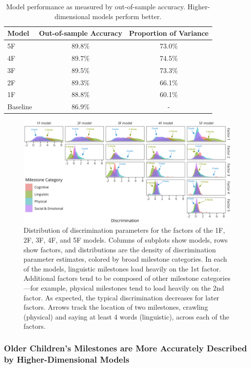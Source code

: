 \documentclass[man, floatsintext]{apa7}
\begin{document}
\begin{table}[!ht]
\caption{\label{tab:study1results}Model performance as measured by out-of-sample accuracy. Higher-dimensional models perform better.}
\centering
\begin{tabular}[t]{lcc}
\toprule
Model & Out-of-sample Accuracy & Proportion of Variance\\
\midrule
5F & 89.8\% & 73.0\% \\
4F & 89.7\% & 74.5\% \\
3F & 89.5\% & 73.3\% \\
2F & 89.3\% & 66.1\% \\
1F & 88.8\% & 60.1\% \\
Baseline & 86.9\% & - \\
\bottomrule
\end{tabular}
\end{table}

\begin{figure}
\centering
\includegraphics[width=\columnwidth]{figures/models_new.png}
\caption{Distribution of discrimination parameters for the factors of the 1F, 2F, 3F, 4F, and 5F models. Columns of subplots show models, rows show factors, and distributions are the density of discrimination parameter estimates, colored by broad milestone categories. In each of the models, linguistic milestones load heavily on the 1st factor. Additional factors tend to be composed of other milestone categories—for example, physical milestones tend to load heavily on the 2nd factor. As expected, the typical discrimination decreases for later factors. Arrows track the location of two milestones, crawling (physical) and saying at least 4 words (linguistic), across each of the factors.}
\label{fig:discs}
\end{figure}

\subsubsection{Older Children's Milestones are More Accurately Described
by Higher-Dimensional
Models}
\end{document}
